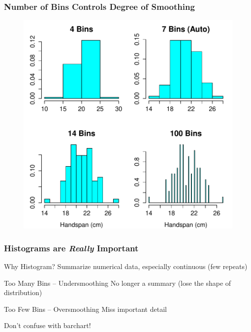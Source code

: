 \documentclass[handout]{beamer}
\begin{document}
\begin{frame}
\frametitle{Number of Bins Controls Degree of Smoothing}
\begin{figure}
\includegraphics[scale = 0.53]{./images/handspan_four_histograms}
\end{figure}
\end{frame}
\begin{frame}
\frametitle{Histograms are \emph{Really} Important}

\begin{block}{Why Histogram?}
Summarize numerical data, especially continuous (few repeats)
\end{block}
\pause
\begin{block}{Too Many Bins -- Undersmoothing}
No longer a summary (lose the shape of distribution)
\end{block}
\pause
\begin{block}{Too Few Bins -- Oversmoothing}
Miss important detail
\end{block}
\pause
\begin{alertblock}{Don't confuse with barchart!}
\end{alertblock}
\end{frame}


\end{document}
